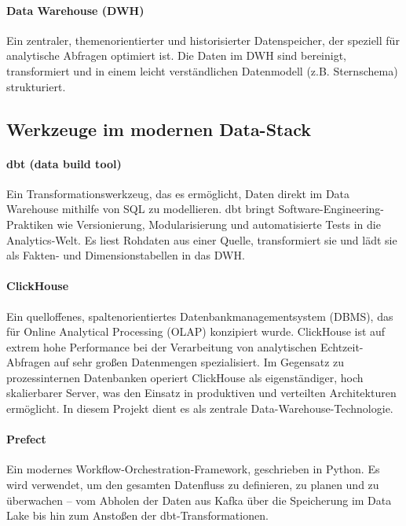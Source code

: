 \documentclass[
    12pt,               
    a4paper,        
    ngerman            
]{scrartcl}
\begin{document}
\paragraph{Data Warehouse (DWH)} Ein zentraler, themenorientierter und historisierter Datenspeicher, der speziell für analytische Abfragen optimiert ist. Die Daten im DWH sind bereinigt, transformiert und in einem leicht verständlichen Datenmodell (z.B. Sternschema) strukturiert.

\subsection{Werkzeuge im modernen Data-Stack}
\label{sec:werkzeuge}

\paragraph{dbt (data build tool)} Ein Transformationswerkzeug, das es ermöglicht, Daten direkt im Data Warehouse mithilfe von SQL zu modellieren. dbt bringt Software-Engineering-Praktiken wie Versionierung, Modularisierung und automatisierte Tests in die Analytics-Welt. Es liest Rohdaten aus einer Quelle, transformiert sie und lädt sie als Fakten- und Dimensionstabellen in das DWH.

\paragraph{ClickHouse} Ein quelloffenes, spaltenorientiertes Datenbankmanagementsystem (DBMS), das für Online Analytical Processing (OLAP) konzipiert wurde. ClickHouse ist auf extrem hohe Performance bei der Verarbeitung von analytischen Echtzeit-Abfragen auf sehr großen Datenmengen spezialisiert. Im Gegensatz zu prozessinternen Datenbanken operiert ClickHouse als eigenständiger, hoch skalierbarer Server, was den Einsatz in produktiven und verteilten Architekturen ermöglicht. In diesem Projekt dient es als zentrale Data-Warehouse-Technologie.

\paragraph{Prefect} Ein modernes Workflow-Orchestration-Framework, geschrieben in Python. Es wird verwendet, um den gesamten Datenfluss zu definieren, zu planen und zu überwachen – vom Abholen der Daten aus Kafka über die Speicherung im Data Lake bis hin zum Anstoßen der dbt-Transformationen.

\end{document}
